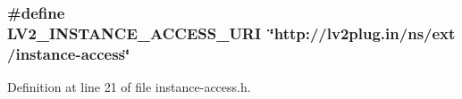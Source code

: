 \subsubsection[{\texorpdfstring{L\+V2\+\_\+\+I\+N\+S\+T\+A\+N\+C\+E\+\_\+\+A\+C\+C\+E\+S\+S\+\_\+\+U\+RI}{LV2_INSTANCE_ACCESS_URI}}]{\setlength{\rightskip}{0pt plus 5cm}\#define L\+V2\+\_\+\+I\+N\+S\+T\+A\+N\+C\+E\+\_\+\+A\+C\+C\+E\+S\+S\+\_\+\+U\+RI~\char`\"{}http\+://{\bf lv2plug.\+in}/{\bf ns}/ext/instance-\/access\char`\"{}}\hypertarget{instance-access_8h_af1ac86ed4647658b93f24c12c634d267}{}\label{instance-access_8h_af1ac86ed4647658b93f24c12c634d267}


Definition at line 21 of file instance-\/access.\+h.

